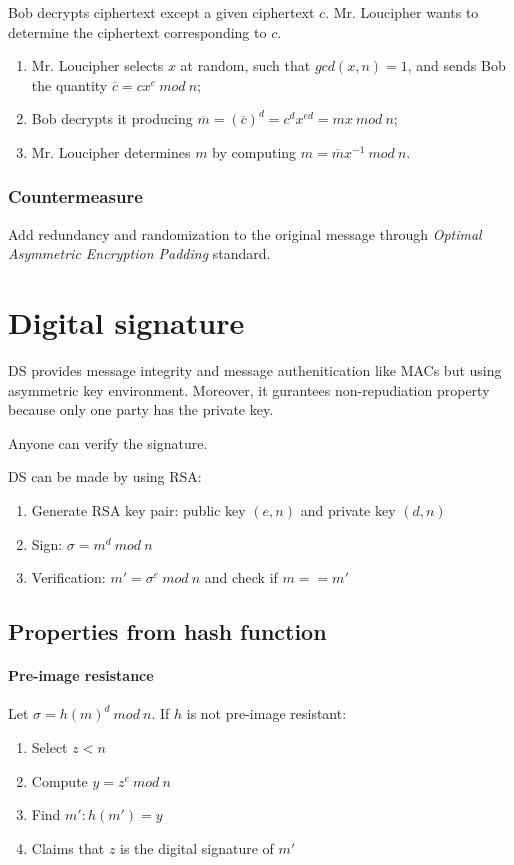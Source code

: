 \documentclass[a4paper,12pt]{article}
\begin{document}
Bob decrypts ciphertext except a given ciphertext $c$. Mr. Loucipher wants to determine the ciphertext corresponding to $c$.

\begin{enumerate}
	\item Mr. Loucipher selects $x$ at random, such that $gcd(x, n) = 1$, and sends Bob the quantity $\overline{c} = cx^e\ mod\ n$;
	\item Bob decrypts it producing $\overline{m} = (\overline{c})^d = c^d x^{ed} = mx\ mod\ n$;
	\item Mr. Loucipher determines $m$ by computing $m = \overline{m} x^{-1}\ mod\ n$.
\end{enumerate} 

\subsubsection{Countermeasure}
Add redundancy and randomization to the original message through \textit{Optimal Asymmetric Encryption Padding} standard.

\section{Digital signature}
DS provides message integrity and message authenitication like MACs but using asymmetric key environment. Moreover, it gurantees non-repudiation property because only one party has the private key.

Anyone can verify the signature.

DS can be made by using RSA:
\begin{enumerate}
	\item Generate RSA key pair: public key $(e,n)$ and private key $(d,n)$
	\item Sign: $\sigma = m^d\ mod\ n$
	\item Verification: $m' = \sigma^e\ mod\ n$ and check if $m == m'$
\end{enumerate}

\subsection{Properties from hash function}
\paragraph{Pre-image resistance}
Let $\sigma = h(m)^d\ mod\ n$. If $h$ is not pre-image resistant:
\begin{enumerate}
	\item Select $z < n$
	\item Compute $y = z^e\ mod\ n$
	\item Find $m' : h(m') = y$
	\item Claims that $z$ is the digital signature of $m'$
\end{enumerate}
\end{document}
